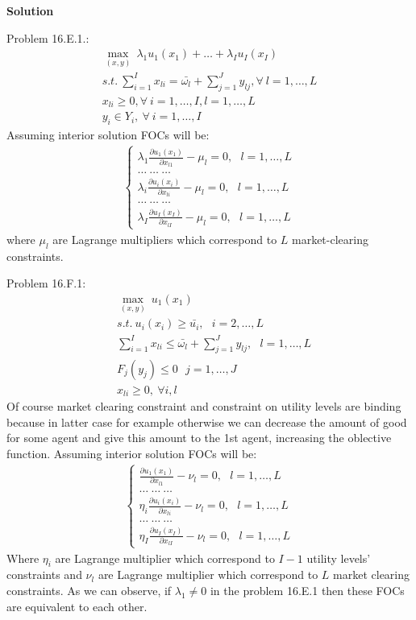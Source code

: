 \documentclass[a4paper]{article}
\begin{document}
\textbf{Solution}

Problem 16.E.1.:
\begin{align*}
\underset{(x, y)}{\max}\ \lambda_1u_1(x_1) + \dots + \lambda_Iu_I(x_I)\\
s.t.\ \sum_{i=1}^I x_{li} = \bar{\omega_l} + \sum_{j=1}^Jy_{lj}, \forall\ l = 1, \dots, L\\
x_{li} \ge 0, \forall\ i = 1, \dots, I, l = 1, \dots, L\\
y_{i} \in Y_i,\ \forall\ i = 1, \dots, I
\end{align*}
Assuming interior solution FOCs will be:
\begin{align*}
\begin{cases}
\lambda_1\frac{\partial u_1(x_1)}{\partial x_{l1}} - \mu_l = 0,\ \ \  l = 1, \dots, L\\
\dots\ \dots\ \dots\\
\lambda_i \frac{\partial u_i(x_i)}{\partial x_{li}} - \mu_l = 0,\ \ \  l = 1, \dots, L\\
\dots\ \dots\ \dots\\
\lambda_I\frac{\partial u_I(x_I)}{\partial x_{lI}} - \mu_l = 0,\ \ \  l = 1, \dots, L
\end{cases}
\end{align*}
where $\mu_l$ are Lagrange multipliers which correspond to $L$ market-clearing constraints. 


Problem 16.F.1:
\begin{align*}
&\underset{(x, y)}{\max}\ u_1(x_1)\\
&s.t.\ u_i(x_i) \ge \bar{u_i},\ \ \ i=2, \dots, L\\
&\sum_{i=1}^Ix_{li} \le \bar{\omega_l} + \sum_{j=1}^Jy_{lj},\ \ \ l = 1, \dots, L\\
&F_j(y_j) \le 0\ \ \ j = 1, \dots, J\\
&x_{li} \ge 0, \ \forall i, l
\end{align*}
Of course market clearing constraint and constraint on utility levels are binding because in latter case for example otherwise we can decrease the amount of good for some agent and give this amount to the 1st agent, increasing the oblective function.
Assuming interior solution FOCs will be:
\begin{align*}
\begin{cases}
\frac{\partial u_1(x_1)}{\partial x_{l1}} - \nu_l = 0, \ \ \ l = 1, \dots, L\\
\dots\ \dots\ \dots\\
\eta_i\frac{\partial u_i(x_i)}{\partial x_{li}} - \nu_l = 0,\ \ \ l = 1, \dots, L\\
\dots\ \dots\ \dots\\
\eta_I\frac{\partial u_I(x_I)}{\partial x_{lI}} - \nu_l = 0, \ \ \ l = 1, \dots, L
\end{cases}
\end{align*}
Where $\eta_i$ are Lagrange multiplier which correspond to $I-1$ utility levels' constraints and $\nu_l$ are Lagrange multiplier which correspond to $L$ market clearing constraints. As we can observe, if $\lambda_1 \neq 0$ in the problem 16.E.1 then these FOCs are equivalent to each other.
\end{document}
